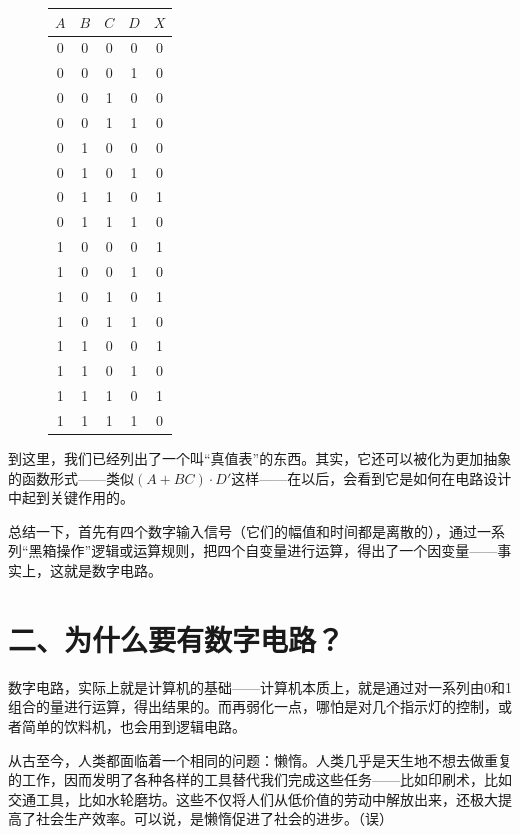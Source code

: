 \documentclass[UTF8]{ctexart}
\begin{document}
\begin{figure}
    \begin{tabular}{|c|c|c|c|c|}\hline\rowcolor{lightgray}
        $A$   &$B$&$C$ & $D$&$X$\\\hline
        0 &0 & 0 & 0   &0\\\hline
        0 &0 & 0 & 1   &0\\\hline
        0 &0 & 1 & 0   &0\\\hline
        0 &0 & 1 & 1   &0\\\hline
        0 &1 & 0 & 0   &0\\\hline
        0 &1 & 0 & 1   &0\\\hline
        0 &1 & 1 & 0   &1\\\hline
        0 &1 & 1 & 1   &0\\\hline
        1 &0 & 0 & 0   &1\\\hline
        1 &0 & 0 & 1   &0\\\hline
        1 &0 & 1 & 0   &1\\\hline
        1 &0 & 1 & 1   &0\\\hline
        1 &1 & 0 & 0   &1\\\hline
        1 &1 & 0 & 1   &0\\\hline
        1 &1 & 1 & 0   &1\\\hline
        1 &1 & 1 & 1   &0\\\hline
    \end{tabular}
\end{figure}

到这里，我们已经列出了一个叫“真值表”的东西。其实，它还可以被化为更加抽象的函数形式——类似$(A+BC)\cdot D'$这样——在以后，会看到它是如何在电路设计中起到关键作用的。

总结一下，首先有四个数字输入信号（它们的幅值和时间都是离散的），通过一系列“黑箱操作”逻辑或运算规则，把四个自变量进行运算，得出了一个因变量——事实上，这就是数字电路。

\section*{二、为什么要有数字电路？}
数字电路，实际上就是计算机的基础——计算机本质上，就是通过对一系列由0和1组合的量进行运算，得出结果的。而再弱化一点，哪怕是对几个指示灯的控制，或者简单的饮料机，也会用到逻辑电路。

从古至今，人类都面临着一个相同的问题：懒惰。人类几乎是天生地不想去做重复的工作，因而发明了各种各样的工具替代我们完成这些任务——比如印刷术，比如交通工具，比如水轮磨坊。这些不仅将人们从低价值的劳动中解放出来，还极大提高了社会生产效率。可以说，是懒惰促进了社会的进步。（误）
\end{document}
